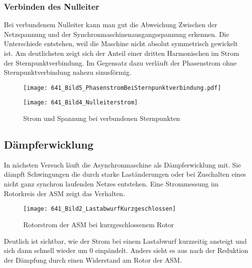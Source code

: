 \begin{flushleft}
\subsubsection{Verbinden des Nulleiter}
Bei verbundenem Nulleiter kann man gut die Abweichung Zwischen der Netzspannung und der Synchronmaschinenausgangsspannung erkennen. Die Unterschiede entstehen, weil die Maschine nicht absolut symmetrisch gewickelt ist. Am deutlichsten zeigt sich der Anteil einer dritten Harmonischen im Strom der Sternpunktverbindung. Im Gegensatz dazu verläuft der Phasenstrom ohne Sternpunktverbindung nahezu sinusförmig.


\begin{figure}[H]
\begin{minipage}[t]{0.49\textwidth}
\centering
\texttt{[image: 641\_Bild5\_PhasenstromBeiSternpunktverbindung.pdf]}
\label{fig:abb1}
\end{minipage}
\begin{minipage}[t]{0.49\textwidth}
\centering
\texttt{[image: 641\_Bild4\_Nulleiterstrom]}
    \label{fig:abb1}
\end{minipage}
\caption{Strom und Spannung bei verbundenen Sternpunkten}
\end{figure}





\subsection{Dämpferwicklung}

In nächsten Versuch läuft die Asynchronmaschine als Dämpferwicklung mit. Sie dämpft Schwingungen die durch starke Laständerungen oder bei Zuschalten eines nicht ganz synchron laufenden Netzes entstehen. Eine Strommessung im Rotorkreis der ASM zeigt das Verhalten.
\vspace{0.3cm}
\begin{figure}[H]
    \centering
    \texttt{[image: 641\_Bild2\_LastabwurfKurzgeschlossen]}
    \caption{Rotorstrom der ASM bei kurzgeschlossenem Rotor}
    \label{fig:abb1}
\end{figure}\vspace{0.3cm}
Deutlich ist sichtbar, wie der Strom bei einem Lastabwurf kurzzeitig ansteigt und sich dann schnell wieder um 0 einpändelt. Anders sieht es aus nach der Reduktion der Dämpfung durch einen Widerstand am Rotor der ASM. 


\end{flushleft}

